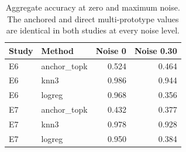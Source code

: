 \begin{table}[t]
\centering
\small
\caption{Aggregate accuracy at zero and maximum noise. The anchored and direct multi-prototype values are identical in both studies at every noise level.}
\label{tab:real-accuracy}
\begin{tabular}{llrr}
\toprule
Study & Method & Noise 0 & Noise 0.30 \\
\midrule
E6 & anchor\_topk & 0.524 & 0.464 \\
E6 & knn3 & 0.986 & 0.944 \\
E6 & logreg & 0.968 & 0.356 \\
\midrule
E7 & anchor\_topk & 0.432 & 0.377 \\
E7 & knn3 & 0.978 & 0.928 \\
E7 & logreg & 0.950 & 0.384 \\
\bottomrule
\end{tabular}
\end{table}
